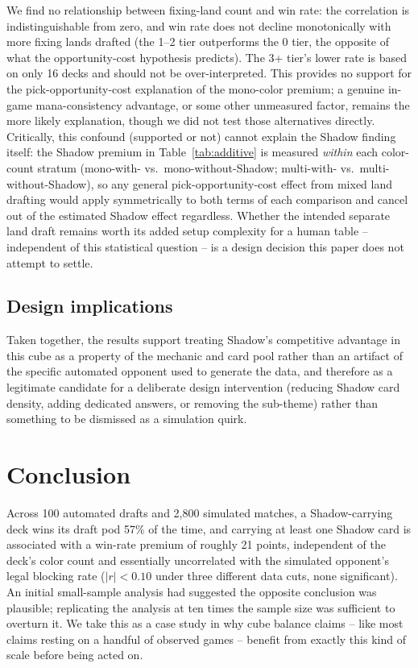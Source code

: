 \documentclass[11pt]{article}
\begin{document}
We find no relationship between fixing-land count and win rate: the correlation
is indistinguishable from zero, and win rate does not decline monotonically with
more fixing lands drafted (the 1--2 tier outperforms the 0 tier, the opposite of
what the opportunity-cost hypothesis predicts). The 3+ tier's lower rate is based
on only 16 decks and should not be over-interpreted. This provides no support for
the pick-opportunity-cost explanation of the mono-color premium; a genuine
in-game mana-consistency advantage, or some other unmeasured factor, remains the
more likely explanation, though we did not test those alternatives directly.
Critically, this confound (supported or not) cannot explain the Shadow finding
itself: the Shadow premium in Table~\ref{tab:additive} is measured \emph{within}
each color-count stratum (mono-with- vs.\ mono-without-Shadow; multi-with- vs.\
multi-without-Shadow), so any general pick-opportunity-cost effect from mixed
land drafting would apply symmetrically to both terms of each comparison and
cancel out of the estimated Shadow effect regardless. Whether the intended
separate land draft remains worth its added setup complexity for a human table --
independent of this statistical question -- is a design decision this paper does
not attempt to settle.

\subsection{Design implications}

Taken together, the results support treating Shadow's competitive advantage in
this cube as a property of the mechanic and card pool rather than an artifact
of the specific automated opponent used to generate the data, and therefore as
a legitimate candidate for a deliberate design intervention (reducing Shadow
card density, adding dedicated answers, or removing the sub-theme) rather than
something to be dismissed as a simulation quirk.

\section{Conclusion}

Across 100 automated drafts and 2{,}800 simulated matches, a Shadow-carrying deck
wins its draft pod 57\% of the time, and carrying at least one Shadow card is
associated with a win-rate premium of roughly 21 points, independent of the
deck's color count and essentially uncorrelated with the simulated opponent's
legal blocking rate ($|r|<0.10$ under three different data cuts, none
significant). An initial small-sample analysis had suggested the opposite
conclusion was plausible; replicating the analysis at ten times the sample size
was sufficient to overturn it. We take this as a case study in why cube
balance claims -- like most claims resting on a handful of observed games --
benefit from exactly this kind of scale before being acted on.
\end{document}
